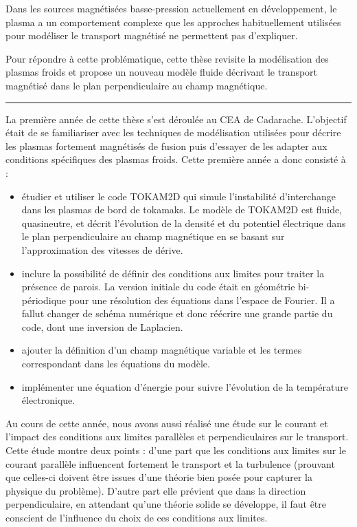 Dans les sources magnétisées basse-pression actuellement en
développement, le plasma a un comportement complexe que les
approches habituellement utilisées pour modéliser le transport
magnétisé ne permettent pas d'expliquer.

Pour répondre à cette problématique, cette thèse revisite la modélisation
des plasmas froids et propose un nouveau modèle fluide décrivant le transport
magnétisé dans le plan perpendiculaire au champ magnétique.

\begin{center}
\rule{0.6\textwidth}{1pt}
\end{center}

La première année de cette thèse s'est déroulée au CEA de Cadarache.
L'objectif était de se familiariser avec les techniques de modélisation
utilisées pour décrire les plasmas fortement magnétisés de fusion puis d'essayer
de les adapter aux conditions spécifiques des plasmas froids. Cette première
année a donc consisté à :

\begin{itemize}
  \item étudier et utiliser le code TOKAM2D qui simule
  l'instabilité d'interchange dans les plasmas de bord de tokamaks. Le 
  modèle de TOKAM2D est fluide, quasineutre, et décrit l'évolution de la
  densité et du potentiel électrique dans le plan perpendiculaire au champ
  magnétique en se basant sur l'approximation des vitesses de dérive.
  \item inclure la possibilité de définir des conditions aux limites pour
  traiter la présence de parois.
  La version initiale du code était en géométrie bi-périodique pour une résolution des
  équations dans l'espace de Fourier. Il a fallut changer de schéma
  numérique et donc réécrire une grande partie du code, dont une inversion de
  Laplacien.
  \item ajouter la définition d'un champ magnétique
  variable et les termes correspondant dans les équations du modèle.
  \item implémenter une équation d'énergie pour suivre l'évolution de la
  température électronique.
\end{itemize} 
 
 Au cours de cette année, nous avons aussi réalisé une étude sur le courant et
 l'impact des conditions aux limites parallèles et perpendiculaires sur le
 transport. Cette étude montre deux points : d'une part que les conditions aux
 limites sur le courant parallèle influencent fortement le transport et la
 turbulence (prouvant que celles-ci doivent être issues d'une
 théorie bien posée pour capturer la physique du problème). D'autre part elle
 prévient que dans la direction perpendiculaire, en attendant qu'une théorie
 solide se développe, il faut être conscient de l'influence du choix de ces
 conditions aux limites.
	
